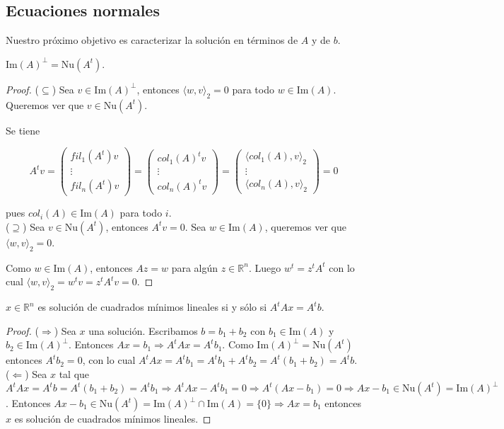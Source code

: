 \subsection{Ecuaciones normales}

Nuestro próximo objetivo es caracterizar la solución en términos de $A$ y de $b$.

\begin{lema}
$\text{Im}(A)^{\perp} = \text{Nu}(A^t)$.

\begin{proof}
($\subseteq$) Sea $v \in \text{Im}(A)^{\perp}$, entonces $\langle w, v \rangle_2 = 0$ para todo $w \in \text{Im}(A)$. Queremos ver que $v \in \text{Nu}(A^t)$.

Se tiene

\[A^tv = \begin{pmatrix}
fil_1(A^t)v\\
\vdots\\
fil_n(A^t) v
\end{pmatrix} = \begin{pmatrix}
col_1(A)^t v\\
\vdots\\
col_n(A)^t v
\end{pmatrix} = \begin{pmatrix}
\langle col_1(A), v \rangle_2\\
\vdots\\
\langle col_n(A), v \rangle_2
\end{pmatrix} = 0\]

pues $col_i(A) \in \text{Im}(A)$ para todo $i$.\\[0.25cm]

($\supseteq$) Sea $v \in \text{Nu}(A^t)$, entonces $A^tv = 0$. Sea $w \in \text{Im}(A)$, queremos ver que $\langle w, v \rangle_2 = 0$.

Como $w \in \text{Im}(A)$, entonces $Az = w$ para algún $z \in \mathbb{R}^n$. Luego $w^t = z^tA^t$ con lo cual $\langle w, v \rangle_2 = w^tv = z^tA^tv = 0$.
\end{proof}
\end{lema}

\begin{propo}
$x \in \mathbb{R}^{n}$ es solución de cuadrados mínimos lineales si y sólo si $A^tAx = A^tb$.

\begin{proof}
($\Rightarrow$) Sea $x$ una solución. Escribamos $b = b_1 + b_2$ con $b_1 \in \text{Im}(A)$ y $b_2 \in \text{Im}(A)^{\perp}$. Entonces $Ax = b_1 \Rightarrow A^tAx = A^tb_1$. Como $\text{Im}(A)^{\perp} = \text{Nu}(A^t)$ entonces $A^tb_2 = 0$, con lo cual $A^tAx = A^tb_1 = A^tb_1 + A^tb_2 = A^t(b_1 + b_2) = A^tb$.\\[0.25cm]

($\Leftarrow$) Sea $x$ tal que $A^tAx = A^tb = A^t(b_1 + b_2) = A^tb_1 \Rightarrow A^tAx - A^tb_1 = 0 \Rightarrow A^t(Ax - b_1) = 0 \Rightarrow Ax - b_1 \in \text{Nu}(A^t) = \text{Im}(A)^{\perp}$. Entonces $Ax - b_1 \in \text{Nu}(A^t) = \text{Im}(A)^{\perp} \cap \text{Im}(A) = \{0\} \Rightarrow Ax = b_1$ entonces $x$ es solución de cuadrados mínimos lineales.
\end{proof}
\end{propo}

